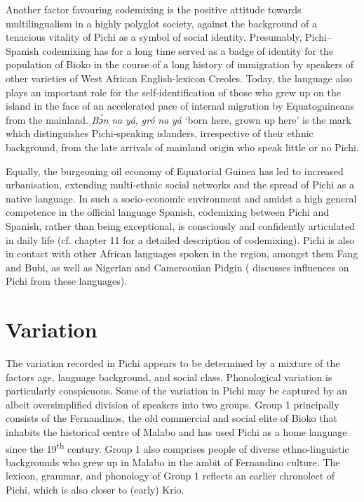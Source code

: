 Another factor favouring codemixing is the positive attitude towards multilingualism in a highly polyglot society, against the background of a tenacious vitality of Pichi as a symbol of social identity. Presumably, Pichi–Spanish codemixing has for a long time served as a badge of identity for the population of Bioko in the course of a long history of immigration by speakers of other varieties of West African English-lexicon Creoles. Today, the language also plays an important role for the self-identification of those who grew up on the island in the face of an accelerated pace of internal migration by Equatoguineans from the mainland. \textit{Bɔ́n} \textit{na} \textit{yá,} \textit{gró} \textit{na} \textit{yá} ‘born here, grown up here’ is the mark which distinguishes Pichi-speaking islanders, irrespective of their ethnic background, from the late arrivals of mainland origin who speak little or no Pichi. 



Equally, the burgeoning oil economy of Equatorial Guinea has led to increased urbanisation, extending multi-ethnic social networks and the spread of Pichi as a native language. In such a socio-economic environment and amidst a high general competence in the official language Spanish, codemixing between Pichi and Spanish, rather than being exceptional, is consciously and confidently articulated in daily life (cf. chapter 11 for a detailed description of codemixing). Pichi is also in contact with other African languages spoken in the region, amongst them Fang and Bubi, as well as Nigerian and Cameroonian Pidgin (\citealt{Yakpo2013} discusses influences on Pichi from these languages).


\section{Variation}\label{sec:1.3}

The variation recorded in Pichi appears to be determined by a mixture of the factors age, language background, and social class. Phonological variation is particularly conspicuous. Some of the variation in Pichi may be captured by an albeit oversimplified division of speakers into two groups. Group 1 principally consists of the Fernandinos, the old commercial and social elite of Bioko \citep{Lynn1984} that inhabits the historical centre of Malabo and has used Pichi as a home language since the 19\textsuperscript{th} century. Group 1 also comprises people of diverse ethno-linguistic backgrounds who grew up in Malabo in the ambit of Fernandino culture. The lexicon, grammar, and phonology of Group 1 reflects an earlier chronolect of Pichi, which is also closer to (early) Krio. 


